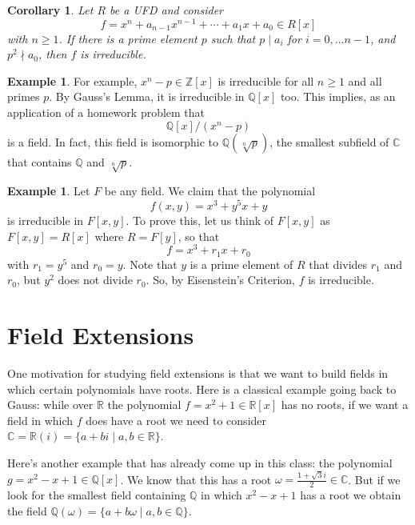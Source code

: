 \documentclass[12pt]{report}
\newtheorem{corollary}[theorem]{Corollary}
\numberwithin{equation}{section}
\numberwithin{theorem}{chapter}
\theoremstyle{definition}
\newtheorem{example}[theorem]{Example}
\newtheorem*{basic properties}{Basic Properties}
\newtheorem*{Important Remark}{Important Remark}
\newcommand{\C}{\mathbb{C}}
\begin{document}
\begin{corollary} 
Let $R$ be a UFD and consider 
$$f = x^n + a_{n-1} x^{n-1} + \cdots + a_1 x + a_0 \in R[x]$$ 
with $n \geqslant 1$. If there is a prime element $p$ such that $p \mid a_i$ for $i = 0, \dots n-1$, and $p^2 \nmid a_0$, then $f$ is irreducible.
\end{corollary}



\begin{example}
For example, $x^n - p \in \mathbb{Z}[x]$ is irreducible for all $n \geq 1$ and all primes $p$.
By Gauss's Lemma, it is irreducible in $\mathbb{Q}[x]$ too. This implies, as an application of a homework problem   that
$$
\mathbb{Q}[x]/(x^n-p)
$$
is a field. In fact, this field is isomorphic to $\mathbb{Q}(\sqrt[n]{p})$, the smallest subfield of $\C$ that contains $\mathbb{Q}$ and  $\sqrt[n]{p}$.
\end{example}


\begin{example} 
Let $F$ be any field.
We claim that the polynomial 
$$f(x,y) = x^3 + y^5 x + y$$ 
is irreducible in $F[x,y]$. To prove this, let us think of $F[x,y]$ as $F[x,y] = R[x]$ where $R = F[y]$, so that 
$$f = x^3 + r_1 x + r_0$$ 
with $r_1 = y^5$ and $r_0 = y$. Note that $y$ is a prime element of $R$ that divides $r_1$ and $r_0$, but $y^2$ does not divide $r_0$. So, by Eisenstein's Criterion, $f$ is irreducible.
\end{example}






\chapter{Field Extensions}

One motivation for studying field extensions is that we want to build fields in which certain polynomials have roots. 
Here is a classical example going back to Gauss: while over $\mathbb{R}$ the polynomial $f = x^2+1\in \mathbb{R}[x]$ has no roots, if we want a field in which $f$ does have a root we need to consider $\C=\mathbb{R}(i)=\{a+bi\mid a,b\in \mathbb{R}\}$. 

Here's another example that has already come up in this class: the polynomial $g=x^2-x+1 \in \mathbb{Q}[x]$. We know that this has a root $\omega = \frac{1 + \sqrt{3}i}{2}\in \C$. But if we look for the smallest field containing $\mathbb{Q}$ in which $x^2-x+1$ has a root we obtain the field $\mathbb{Q}(\omega)=\{a+b\omega \mid a,b\in \mathbb{Q}\}$.
\end{document}

